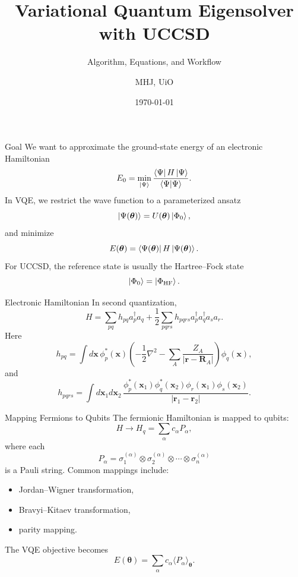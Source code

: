 \documentclass[aspectratio=169]{beamer}
\title{Variational Quantum Eigensolver with UCCSD}
\subtitle{Algorithm, Equations, and Workflow}
\author{MHJ, UiO}
\date{\today}
\begin{document}
\begin{frame}
\titlepage
\end{frame}
\begin{frame}{Goal}
We want to approximate the ground-state energy of an electronic Hamiltonian
\[
E_0 = \min_{\ket{\Psi}} 
\frac{\bra{\Psi} H \ket{\Psi}}{\braket{\Psi|\Psi}}.
\]
\vspace{0.3cm}
In VQE, we restrict the wave function to a parameterized ansatz
\[
\ket{\Psi(\bm{\theta})}
=
U(\bm{\theta})\ket{\Phi_0},
\]
and minimize
\[
E(\bm{\theta})
=
\bra{\Psi(\bm{\theta})}H\ket{\Psi(\bm{\theta})}.
\]
\vspace{0.3cm}
For UCCSD, the reference state is usually the Hartree--Fock state
\[
\ket{\Phi_0} = \ket{\Phi_{\mathrm{HF}}}.
\]
\end{frame}
\begin{frame}{Electronic Hamiltonian}
In second quantization,
\[
H
=
\sum_{pq} h_{pq} a_p^\dagger a_q
+
\frac{1}{2}
\sum_{pqrs}
h_{pqrs}
a_p^\dagger a_q^\dagger a_s a_r .
\]
\vspace{0.3cm}
Here
\[
h_{pq}
=
\int d\mathbf{x}\,
\phi_p^*(\mathbf{x})
\left(
-\frac12\nabla^2
-
\sum_A \frac{Z_A}{|\mathbf{r}-\mathbf{R}_A|}
\right)
\phi_q(\mathbf{x}),
\]
and
\[
h_{pqrs}
=
\int d\mathbf{x}_1 d\mathbf{x}_2\,
\frac{
\phi_p^*(\mathbf{x}_1)
\phi_q^*(\mathbf{x}_2)
\phi_r(\mathbf{x}_1)
\phi_s(\mathbf{x}_2)}
{|\mathbf{r}_1-\mathbf{r}_2|}.
\]
\end{frame}
\begin{frame}{Mapping Fermions to Qubits}
The fermionic Hamiltonian is mapped to qubits:
\[
H
\longrightarrow
H_q
=
\sum_{\alpha} c_\alpha P_\alpha ,
\]
where each
\[
P_\alpha
=
\sigma_1^{(\alpha)}
\otimes
\sigma_2^{(\alpha)}
\otimes
\cdots
\otimes
\sigma_n^{(\alpha)}
\]
is a Pauli string.
\vspace{0.3cm}
Common mappings include:
\begin{itemize}
\item Jordan--Wigner transformation,
\item Bravyi--Kitaev transformation,
\item parity mapping.
\end{itemize}
\vspace{0.3cm}
The VQE objective becomes
\[
E(\bm{\theta})
=
\sum_\alpha c_\alpha
\langle P_\alpha\rangle_{\bm{\theta}}.
\]
\end{frame}
\end{document}
